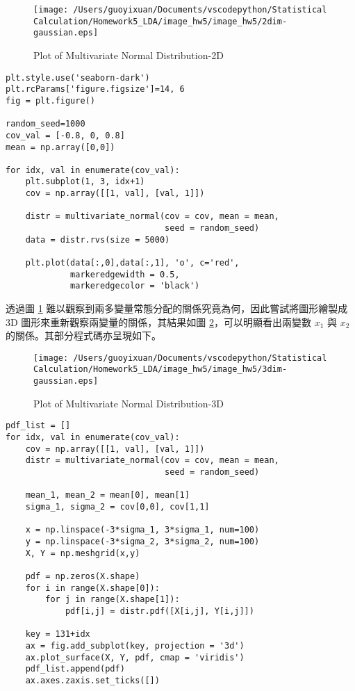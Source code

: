 \begin{figure}[H]
    \centering
        \texttt{[image: /Users/guoyixuan/Documents/vscodepython/Statistical Calculation/Homework5\_LDA/image\_hw5/image\_hw5/2dim-gaussian.eps]}
    \caption{Plot of Multivariate Normal Distribution-2D}
    \label{fig:2d gaussian}
\end{figure}

\bigskip

\begin{lstlisting}
plt.style.use('seaborn-dark')
plt.rcParams['figure.figsize']=14, 6
fig = plt.figure()
 
random_seed=1000
cov_val = [-0.8, 0, 0.8]
mean = np.array([0,0])
 
for idx, val in enumerate(cov_val):
    plt.subplot(1, 3, idx+1)
    cov = np.array([[1, val], [val, 1]])
    
    distr = multivariate_normal(cov = cov, mean = mean,
                                seed = random_seed)
    data = distr.rvs(size = 5000)
 
    plt.plot(data[:,0],data[:,1], 'o', c='red',
             markeredgewidth = 0.5,
             markeredgecolor = 'black')
\end{lstlisting}

透過圖 \ref{fig:2d gaussian} 難以觀察到兩多變量常態分配的關係究竟為何，因此嘗試將圖形繪製成 3D 圖形來重新觀察兩變量的關係，其結果如圖 \ref{fig:3d gaussian}，可以明顯看出兩變數 $x_1$ 與 $x_2$ 的關係。其部分程式碼亦呈現如下。

\begin{figure}[H]
    \centering
        \texttt{[image: /Users/guoyixuan/Documents/vscodepython/Statistical Calculation/Homework5\_LDA/image\_hw5/image\_hw5/3dim-gaussian.eps]}
    \caption{Plot of Multivariate Normal Distribution-3D}
    \label{fig:3d gaussian}
\end{figure}

\bigskip

\begin{lstlisting}
pdf_list = []
for idx, val in enumerate(cov_val):
    cov = np.array([[1, val], [val, 1]])
    distr = multivariate_normal(cov = cov, mean = mean,
                                seed = random_seed)
     
    mean_1, mean_2 = mean[0], mean[1]
    sigma_1, sigma_2 = cov[0,0], cov[1,1]
     
    x = np.linspace(-3*sigma_1, 3*sigma_1, num=100)
    y = np.linspace(-3*sigma_2, 3*sigma_2, num=100)
    X, Y = np.meshgrid(x,y)

    pdf = np.zeros(X.shape)
    for i in range(X.shape[0]):
        for j in range(X.shape[1]):
            pdf[i,j] = distr.pdf([X[i,j], Y[i,j]])

    key = 131+idx
    ax = fig.add_subplot(key, projection = '3d')
    ax.plot_surface(X, Y, pdf, cmap = 'viridis')
    pdf_list.append(pdf)
    ax.axes.zaxis.set_ticks([])

\end{lstlisting}

